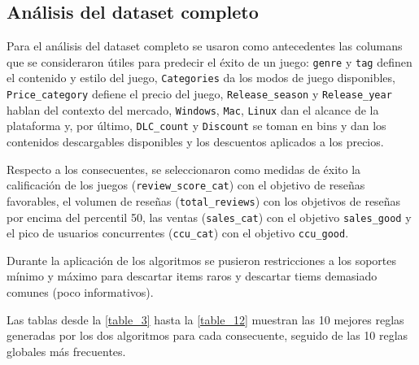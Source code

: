 \documentclass[conference]{IEEEtran}
\begin{document}
\subsection{Análisis del dataset completo}
Para el análisis del dataset completo se usaron como antecedentes las columans que se consideraron útiles para predecir el éxito de un juego: \texttt{genre} y \texttt{tag} definen el contenido y estilo del juego, \texttt{Categories} da los modos de juego disponibles, \texttt{Price\_category} defiene el precio del juego, \texttt{Release\_season} y \texttt{Release\_year} hablan del contexto del mercado, \texttt{Windows}, \texttt{Mac}, \texttt{Linux} dan el alcance de la plataforma y, por último, \texttt{DLC\_count} y \texttt{Discount} se toman en bins y dan los contenidos descargables disponibles y los descuentos aplicados a los precios.

Respecto a los consecuentes, se seleccionaron como medidas de éxito la calificación de los juegos (\texttt{review\_score\_cat}) con el objetivo de reseñas favorables, el volumen de reseñas (\texttt{total\_reviews}) con los objetivos de reseñas por encima del percentil 50, las ventas (\texttt{sales\_cat}) con el objetivo \texttt{sales\_good} y el pico de usuarios concurrentes (\texttt{ccu\_cat}) con el objetivo \texttt{ccu\_good}.

Durante la aplicación de los algoritmos se pusieron restricciones a los soportes mínimo y máximo para descartar items raros y descartar tiems demasiado comunes (poco informativos).

Las tablas desde la \ref{table_3} hasta la \ref{table_12} muestran las 10 mejores reglas generadas por los dos algoritmos para cada consecuente, seguido de las 10 reglas globales más frecuentes. 
\end{document}
